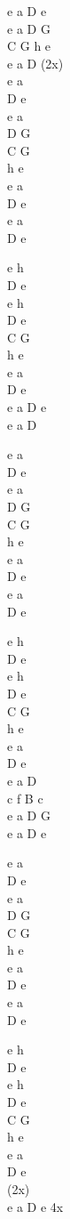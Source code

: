 \begin{chord}
    e a D e\\
    e a D G\\
    C G h e\\
    e a D (2x)\\
    e a\\
    D e\\
    e a\\
    D G\\
    C G\\
    h e\\
    e a\\
    D e\\
    e a\\
    D e

    e h\\
    D e\\
    e h\\
    D e\\
    C G\\
    h e\\
    e a\\
    D e\\
    e a D e\\
    e a D

    e a\\
    D e\\
    e a\\
    D G\\
    C G\\
    h e\\
    e a\\
    D e\\
    e a\\
    D e

    e h\\
    D e\\
    e h\\
    D e\\
    C G\\
    h e\\
    e a\\
    D e\\
    e a D\\
    c f B c\\
    e a D G \\
    e a D e

e a\\
D e\\
e a\\
D G\\
C G\\
h e\\
e a\\
D e\\
e a\\
D e

e h\\
D e\\
e h\\
D e\\
C G\\
h e\\
e a\\
D e\\
(2x)\\
e a D e 4x
\end{chord}
